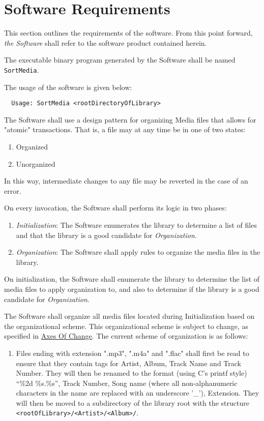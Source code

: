 \documentclass{designdoc}
\begin{document}
\section{Software Requirements}
This section outlines the requirements of the software. From this point
forward, \emph{the Software} shall refer to the software product contained
herein.

The executable binary program generated by the Software shall be named
\texttt{SortMedia}.

The usage of the software is given below:

\begin{verbatim}
  Usage: SortMedia <rootDirectoryOfLibrary>
\end{verbatim}

The Software shall use a design pattern for organizing Media files that allows
for "atomic" transactions. That is, a file may at any time be in one of two
states:
\begin{enumerate}
\item Organized
\item Unorganized
\end{enumerate}
In this way, intermediate changes to any file may be reverted in the case of
an error.

On every invocation, the Software shall perform its logic in two phases:
\begin{enumerate}
\item \textit{Initialization}: The Software enumerates the library to determine
  a list of files and that the library is a good candidate for
  \textit{Organization}.
\item \textit{Organization}: The Software shall apply rules to organize the
  media files in the library.
\end{enumerate}

On initialization, the Software shall enumerate the library to determine the
list of media files to apply organization to, and also to determine if the
library is a good candidate for \textit{Organization}.

The Software shall organize all media files located during Initialization
based on the organizational scheme. This organizational scheme is subject to
change, as specified in \hyperlink{sec:axesOfChange}{Axes Of Change}. The
current scheme of organization is as follows:
\begin{enumerate}
\item Files ending with extension ".mp3", ".m4a" and ".flac" shall first be
  read to ensure that they contain tags for Artist, Album, Track Name and Track
  Number. They will then be renamed to the format (using C's printf style)
  ``\%2d \%s.\%s'', Track Number, Song name (where all non-alphanumeric
  characters in the name are replaced with an underscore '\_'), Extension. They
  will then be moved to a subdirectory of the library root with the structure
  \texttt{<rootOfLibrary>/<Artist>/<Album>/}.
\end{enumerate}
\end{document}
